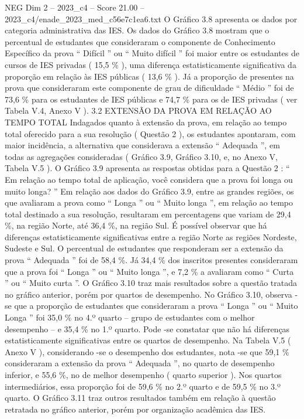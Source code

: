 \begin{textsample}{NEG Dim 2 – 2023\_c4 – Score 21.00 – 2023\_c4/enade\_2023\_med\_c56e7c1ea6.txt}
O Gráfico 3.8 apresenta os dados por categoria administrativa das IES.
Os dados do Gráfico 3.8 mostram que o percentual de estudantes que consideraram o componente de Conhecimento Específico da prova “ Difícil ” ou “ Muito difícil ” foi maior entre os estudantes de cursos de IES privadas ( 15,5 \% ), uma diferença estatisticamente significativa da proporção em relação às IES públicas ( 13,6 \% ).
Já a proporção de presentes na prova que consideraram este componente de grau de dificuldade “ Médio ” foi de 73,6 \% para os estudantes de IES públicas e 74,7 \% para os de IES privadas ( ver Tabela V.4, Anexo V ). 3.2 EXTENSÃO DA PROVA EM RELAÇÃO AO TEMPO TOTAL Indagados quanto à extensão da prova, em relação ao tempo total oferecido para a sua resolução ( Questão 2 ), os estudantes apontaram, com maior incidência, a alternativa que considerava a extensão “ Adequada ”, em todas as agregações consideradas ( Gráfico 3.9, Gráfico 3.10, e, no Anexo V, Tabela V.5 ).
O Gráfico 3.9 apresenta as respostas obtidas para a Questão 2 : “ Em relação ao tempo total de aplicação, você considera que a prova foi longa ou muito longa? ” Em relação aos dados do Gráfico 3.9, entre as grandes regiões, os que avaliaram a prova como “ Longa ” ou “ Muito longa ”, em relação ao tempo total destinado a sua resolução, resultaram em percentagens que variam de 29,4 \%, na região Norte, até 36,4 \%, na região Sul.
É possível observar que há diferenças estatisticamente significativas entre a região Norte as regiões Nordeste, Sudeste e Sul.
O percentual de estudantes que responderam ser a extensão da prova “ Adequada ” foi de 58,4 \%.
Já 34,4 \% dos inscritos presentes consideraram que a prova foi “ Longa ” ou “ Muito longa ”, e 7,2 \% a avaliaram como “ Curta ” ou “ Muito curta ”.
O Gráfico 3.10 traz mais resultados sobre a questão tratada no gráfico anterior, porém por quartos de desempenho.
No Gráfico 3.10, observa -se que a proporção de estudantes que consideraram a prova “ Longa ” ou “ Muito Longa ” foi 35,0 \% no 4.º quarto – grupo de estudantes com o melhor desempenho – e 35,4 \% no 1.º quarto.
Pode -se constatar que não há diferenças estatisticamente significativas entre os quartos de desempenho.
Na Tabela V.5 ( Anexo V ), considerando -se o desempenho dos estudantes, nota -se que 59,1 \% consideraram a extensão da prova “ Adequada ”, no quarto de desempenho inferior, e 55,6 \%, no de melhor desempenho ( quarto superior ).
Nos quartos intermediários, essa proporção foi de 59,6 \% no 2.º quarto e de 59,5 \% no 3.º quarto.
O Gráfico 3.11 traz outros resultados também em relação à questão retratada no gráfico anterior, porém por organização acadêmica das IES.

\end{textsample}
